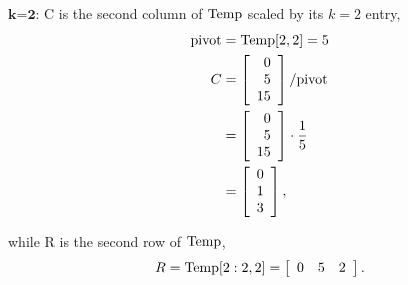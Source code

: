 $\textbf{k=2:}$ C is the second column of ${\rm Temp}$ scaled by its $ k=2$ entry,
\begin{align*}
    \textrm{pivot} &= {\rm Temp[2,2]} = 5 \\
    C &= \left[ \begin{array}{r} 0\\ 5 \\ 15 \end{array} \right] \slash\textrm{pivot} \\
    &= \left[ \begin{array}{r} 0 \\ 5 \\ 15 \end{array} \right] \cdot \frac{1}{5} \\
    &= \left[ \begin{array}{r} 0 \\ 1 \\ 3 \end{array} \right],
\end{align*}

while R is the second row of ${\rm Temp}$,
$$ R ={\rm Temp[2:2,2]} =\left[ \begin{array}{rrr} 0 & 5 & 2 \end{array} \right]. $$

